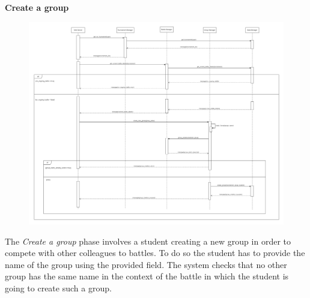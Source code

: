\documentclass[../DD.tex]{subfiles}
\begin{document}
    \textbf{Create a group}\\
    \begin{figure}[H]
        \centering
        \hspace*{-3cm}
        \includegraphics[width=1.4\textwidth]{../assets/section_2/CreateAGroup.png}
    \end{figure}
    The \textit{Create a group} phase involves a student creating a new group in order to compete with other colleagues to battles.
    To do so the student has to provide the name of the group using the provided field.
    The system checks that no other group has the same name in the context of the battle in which the student is going to create such a group.
    \newpage
\end{document}
